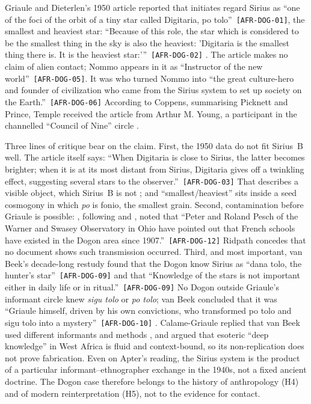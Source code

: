 \documentclass[11pt,a4paper]{article}
\newcommand{\pid}[1]{\texttt{\small #1}}
\begin{document}
Griaule and Dieterlen's 1950 article reported that initiates regard Sirius as \enquote{one of the foci of the orbit of a tiny star called Digitaria, po tolo}~\pid{[AFR-DOG-01]}, the smallest and heaviest star: \enquote{Because of this role, the star which is considered to be the smallest thing in the sky is also the heaviest: 'Digitaria is the smallest thing there is. It is the heaviest star:'}~\pid{[AFR-DOG-02]} \parencite{griaule1950sirius}. The article makes no claim of alien contact; Nommo appears in it as \enquote{Instructor of the new world}~\pid{[AFR-DOG-05]}. It was \textcite{temple1976sirius} who turned Nommo into \enquote{the great culture-hero and founder of civilization who came from the Sirius system to set up society on the Earth.}~\pid{[AFR-DOG-06]} According to Coppens, summarising Picknett and Prince, Temple received the article from Arthur M. Young, a participant in the channelled ``Council of Nine'' circle \parencite{coppens2000sirius,picknettprince1999stargate}.

Three lines of critique bear on the claim. First, the 1950 data do not fit Sirius~B well. The article itself says: \enquote{When Digitaria is close to Sirius, the latter becomes brighter; when it is at its most distant from Sirius, Digitaria gives off a twinkling effect, suggesting several stars to the observer.}~\pid{[AFR-DOG-03]} That describes a visible object, which Sirius~B is not \parencite{jamesthorpe1999mysteries}; and ``smallest/heaviest'' sits inside a seed cosmogony in which \emph{po} is fonio, the smallest grain. Second, contamination before Griaule is possible: \textcite{ridpath1978sirius}, following \textcite{pesch1977dogon} and \textcite{sagan1979broca}, noted that \enquote{Peter and Roland Pesch of the Warner and Swasey Observatory in Ohio have pointed out that French schools have existed in the Dogon area since 1907.}~\pid{[AFR-DOG-12]} Ridpath concedes that no document shows such transmission occurred. Third, and most important, van Beek's decade-long restudy found that the Dogon know Sirius as \enquote{dana tolo, the hunter's star}~\pid{[AFR-DOG-09]} and that \enquote{Knowledge of the stars is not important either in daily life or in ritual.}~\pid{[AFR-DOG-09]} No Dogon outside Griaule's informant circle knew \emph{sigu tolo} or \emph{po tolo}; van Beek concluded that it was \enquote{Griaule himself, driven by his own convictions, who transformed po tolo and sigu tolo into a mystery}~\pid{[AFR-DOG-10]} \parencite{vanbeek1991dogon}. Calame-Griaule replied that van Beek used different informants and methods \parencite{calamegriaule1991}, and \textcite{apter2005griaule} argued that esoteric ``deep knowledge'' in West Africa is fluid and context-bound, so its non-replication does not prove fabrication. Even on Apter's reading, the Sirius system is the product of a particular informant--ethnographer exchange in the 1940s, not a fixed ancient doctrine. The Dogon case therefore belongs to the history of anthropology (H4) and of modern reinterpretation (H5), not to the evidence for contact.
\end{document}
